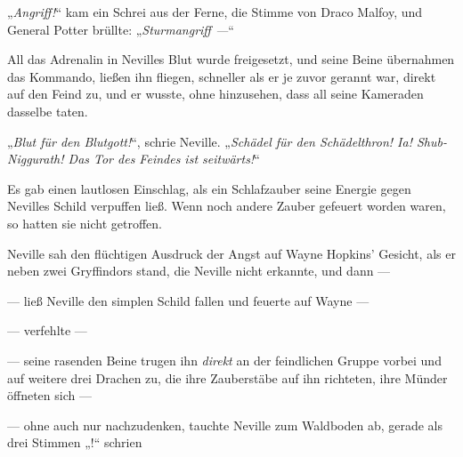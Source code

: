 „\emph{Angriff!}“ kam ein Schrei aus der Ferne, die Stimme von Draco Malfoy, und General Potter brüllte: „\emph{Sturmangriff —}“

All das Adrenalin in Nevilles Blut wurde freigesetzt, und seine Beine übernahmen das Kommando, ließen ihn fliegen, schneller als er je zuvor gerannt war, direkt auf den Feind zu, und er wusste, ohne hinzusehen, dass all seine Kameraden dasselbe taten.

„\emph{Blut für den Blutgott!}“, schrie Neville.
„\emph{Schädel für den Schädelthron! Ia! Shub-Niggurath! Das Tor des Feindes ist seitwärts!}“

Es gab einen lautlosen Einschlag, als ein Schlafzauber seine Energie gegen Nevilles Schild verpuffen ließ. Wenn noch andere Zauber gefeuert worden waren, so hatten sie nicht getroffen.

Neville sah den flüchtigen Ausdruck der Angst auf Wayne Hopkins’ Gesicht, als er neben zwei Gryffindors stand, die Neville nicht erkannte, und dann —

— ließ Neville den simplen Schild fallen und feuerte auf Wayne —

— verfehlte —

— seine rasenden Beine trugen ihn \emph{direkt} an der feindlichen Gruppe vorbei und auf weitere drei Drachen zu, die ihre Zauberstäbe auf ihn richteten, ihre Münder öffneten sich —

— ohne auch nur nachzudenken, tauchte Neville zum Waldboden ab, gerade als drei Stimmen „!“ schrien

